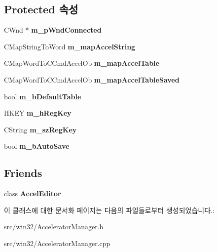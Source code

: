 \subsection*{Protected 속성}
\begin{DoxyCompactItemize}
\item 
\mbox{\label{class_c_accelerator_manager_a24f706c75f754982051e1d7fad1916da}} 
C\+Wnd $\ast$ {\bfseries m\+\_\+p\+Wnd\+Connected}
\item 
\mbox{\label{class_c_accelerator_manager_abb40dbb1a44c47ac22590e8f1243835b}} 
C\+Map\+String\+To\+Word {\bfseries m\+\_\+map\+Accel\+String}
\item 
\mbox{\label{class_c_accelerator_manager_a16b8d3e9328bc0eeeb048630deff2768}} 
C\+Map\+Word\+To\+C\+Cmd\+Accel\+Ob {\bfseries m\+\_\+map\+Accel\+Table}
\item 
\mbox{\label{class_c_accelerator_manager_ad7c3ac9a16b8f19e0b5524d8582a5fae}} 
C\+Map\+Word\+To\+C\+Cmd\+Accel\+Ob {\bfseries m\+\_\+map\+Accel\+Table\+Saved}
\item 
\mbox{\label{class_c_accelerator_manager_ac563baf2a7cedb91bc44e9b8581a6020}} 
bool {\bfseries m\+\_\+b\+Default\+Table}
\item 
\mbox{\label{class_c_accelerator_manager_a2652d64c947f7f3474b3aa054861b34b}} 
H\+K\+EY {\bfseries m\+\_\+h\+Reg\+Key}
\item 
\mbox{\label{class_c_accelerator_manager_a03a6d0e43bcfb63cf1a23ad12cb5aa35}} 
C\+String {\bfseries m\+\_\+sz\+Reg\+Key}
\item 
\mbox{\label{class_c_accelerator_manager_a37b504c74c13ca2d62eea8abffe73102}} 
bool {\bfseries m\+\_\+b\+Auto\+Save}
\end{DoxyCompactItemize}
\subsection*{Friends}
\begin{DoxyCompactItemize}
\item 
\mbox{\label{class_c_accelerator_manager_ad13d9a415d0447ece033ae132991aefc}} 
class {\bfseries Accel\+Editor}
\end{DoxyCompactItemize}


이 클래스에 대한 문서화 페이지는 다음의 파일들로부터 생성되었습니다.\+:\begin{DoxyCompactItemize}
\item 
src/win32/Accelerator\+Manager.\+h\item 
src/win32/Accelerator\+Manager.\+cpp\end{DoxyCompactItemize}
